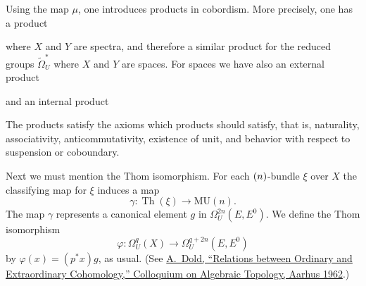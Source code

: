 \documentclass[english, oneside, letterpaper]{book}
\DeclareMathOperator{\Th}{\mathrm{Th}}
\DeclareMathOperator{\M}{\mathrm{M}}
\let\U\relax
\DeclareMathOperator{\U}{\mathrm{U}}
\newcommand{\MU}{\mathrm{MU}}
\newcommand{\nn}[2]{#2} %
\newcommand{\nnt}{\otimes}
\begin{document}
Using the map $\mu$, one introduces products in cobordism. More precisely, one has a product
\begin{diagram*}
\end{diagram*}%
where $X$ and $Y$ are spectra, and therefore a similar product for the reduced groups $\widetilde{\Omega}_U^*$ where $X$ and $Y$ are spaces. For spaces we have also an external product
\begin{diagram*}
\end{diagram*}%
and an internal product
\begin{diagram*}
\end{diagram*}%
The products satisfy the axioms which products should satisfy, that is, naturality, associativity, anticommutativity, existence of unit, and behavior with respect to suspension or coboundary.

Next we must mention the Thom isomorphism. For each $\U(n)$-bundle $\xi$ over $X$ the classifying map for $\xi$ induces a map
\[\gamma\colon\nn{\M(\xi)}{\Th(\xi)}\rightarrow\MU(n).\]
The map $\gamma$ represents a canonical element $g$ in $\Omega_U^{2n}(E,E^0)$. We define the Thom isomorphism
\[\varphi\colon\Omega^q_U(X)\longrightarrow\Omega_U^{q+2n}(E,E^0)\]
by $\varphi(x)=(p^*x)g$, as usual. (See \href{http://www.mathnet.ru/php/archive.phtml?wshow=paper&jrnid=mat&paperid=350&option_lang=eng}{A.\ Dold, ``Relations between Ordinary and Extraordinary Cohomology,'' Colloquium on Algebraic Topology, Aarhus 1962}.)
\end{document}
